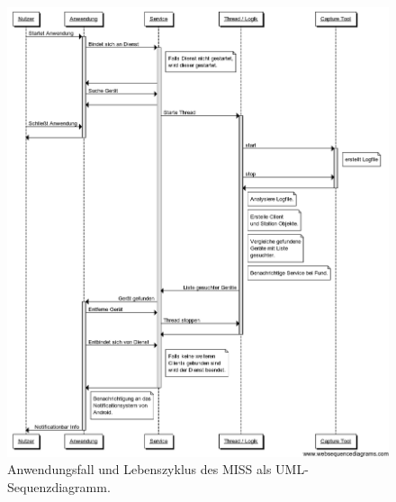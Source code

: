 \documentclass[]{report}
\begin{document}
\newpage
\begin{figure}[h!]
    \centering 
    \includegraphics[width=5.0in]{bilder/uml.png}
    \caption{Anwendungsfall und Lebenszyklus des MISS als UML-Sequenzdiagramm.}
    \label{fig:uml}
\end{figure}
\end{document}
